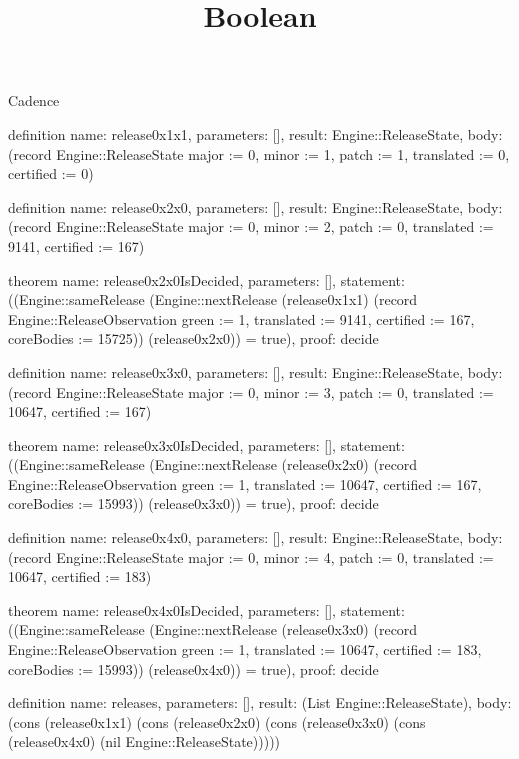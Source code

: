 \begin{lexlean}{Cadence}
\title{Boolean}
\begin{semanticmodule}
definition{
  name: release0x1x1,
  parameters: [],
  result: Engine::ReleaseState,
  body: (record Engine::ReleaseState {major := 0, minor := 1, patch := 1, translated := 0, certified := 0})
}

definition{
  name: release0x2x0,
  parameters: [],
  result: Engine::ReleaseState,
  body: (record Engine::ReleaseState {major := 0, minor := 2, patch := 0, translated := 9141, certified := 167})
}

theorem{
  name: release0x2x0IsDecided,
  parameters: [],
  statement: ((Engine::sameRelease (Engine::nextRelease (release0x1x1) (record Engine::ReleaseObservation {green := 1, translated := 9141, certified := 167, coreBodies := 15725})) (release0x2x0)) = true),
  proof: decide{}
}

definition{
  name: release0x3x0,
  parameters: [],
  result: Engine::ReleaseState,
  body: (record Engine::ReleaseState {major := 0, minor := 3, patch := 0, translated := 10647, certified := 167})
}

theorem{
  name: release0x3x0IsDecided,
  parameters: [],
  statement: ((Engine::sameRelease (Engine::nextRelease (release0x2x0) (record Engine::ReleaseObservation {green := 1, translated := 10647, certified := 167, coreBodies := 15993})) (release0x3x0)) = true),
  proof: decide{}
}

definition{
  name: release0x4x0,
  parameters: [],
  result: Engine::ReleaseState,
  body: (record Engine::ReleaseState {major := 0, minor := 4, patch := 0, translated := 10647, certified := 183})
}

theorem{
  name: release0x4x0IsDecided,
  parameters: [],
  statement: ((Engine::sameRelease (Engine::nextRelease (release0x3x0) (record Engine::ReleaseObservation {green := 1, translated := 10647, certified := 183, coreBodies := 15993})) (release0x4x0)) = true),
  proof: decide{}
}

definition{
  name: releases,
  parameters: [],
  result: (List Engine::ReleaseState),
  body: (cons (release0x1x1) (cons (release0x2x0) (cons (release0x3x0) (cons (release0x4x0) (nil Engine::ReleaseState)))))
}
\end{semanticmodule}
\end{lexlean}
